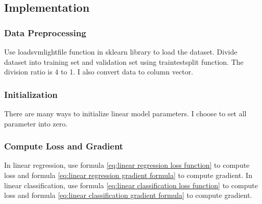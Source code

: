 \documentclass[journal, a4paper]{IEEEtran}
\begin{document}
\subsection{Implementation}

\subsubsection{Data Preprocessing}
Use load\textunderscore svmlight\textunderscore file function in sklearn library to load the dataset.
Divide dataset into training set and validation set using train\textunderscore test\textunderscore split function.
The division ratio is 4 to 1.
I also convert data to column vector.


\subsubsection{Initialization}
There are many ways to initialize linear model parameters.
I choose to set all parameter into zero.
\subsubsection{Compute Loss and Gradient} \label{compute loss and gradient}
In linear regression, use formula \eqref{eq:linear regression loss function} to compute loss and formula \eqref{eq:linear regression gradient formula} to compute gradient.
In linear classification, use formula \eqref{eq:linear classification loss function} to compute loss and formula \eqref{eq:linear classification gradient formula} to compute gradient.

\end{document}
